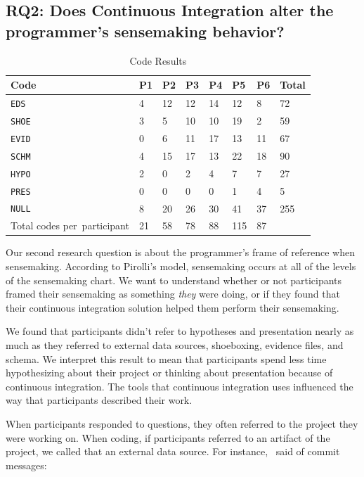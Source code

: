 \documentclass{sig-alternate}
\begin{document}
\subsection{RQ2: Does Continuous Integration alter the programmer's sensemaking behavior?}
\begin{table}
	\centering
	\caption{Code Results}
	\label{table:coderesults}
	\begin{tabular}{ | >{\centering\arraybackslash}p{} | m{0.4cm} | l | l | l | l | l | l | }
		\hline
		\rowcolor{black!20!}Code & P1 & P2 & P3 & P4 & P5 & P6 & Total \\ \hline
		\texttt{EDS} & 4 & 12 & 12 & 14 & 12 & 8 & 72 \\ \hline
		\texttt{SHOE} & 3 & 5 & 10 & 10 & 19 & 2 & 59 \\ \hline
		\texttt{EVID} & 0 & 6 & 11 & 17 & 13 & 11 & 67 \\ \hline
		\texttt{SCHM} & 4 & 15 & 17 & 13 & 22 & 18 & 90 \\ \hline
		\texttt{HYPO} & 2 & 0 & 2 & 4 & 7 & 7 & 27 \\ \hline
		\texttt{PRES} & 0 & 0 & 0 & 0 & 1 & 4 & 5 \\ \hline
		\texttt{NULL} & 8 & 20 & 26 & 30 & 41 & 37 & 255 \\ \hline
		\rowcolor{black!20!}Total codes \mbox{per participant} & 21 & 58 & 78 & 88 & 115 & 87 &  \\ \hline
	\end{tabular}
\end{table}
Our second research question is about the programmer's frame of reference when sensemaking. According to Pirolli's model\cite{pirolli:sensemaking}, sensemaking occurs at all of the levels of the sensemaking chart. We want to understand whether or not participants framed their sensemaking as something \textit{they} were doing, or if they found that their continuous integration solution helped them perform their sensemaking.

We found that participants didn't refer to hypotheses and presentation nearly as much as they referred to external data sources, shoeboxing, evidence files, and schema. We interpret this result to mean that participants spend less time hypothesizing about their project or thinking about presentation because of continuous integration. The tools that continuous integration uses influenced the way that participants described their work.

When participants responded to questions, they often referred to the project they were working on. When coding, if participants referred to an artifact of the project, we called that an external data source. For instance, \srutitwo\ said of commit messages: 
\end{document}
